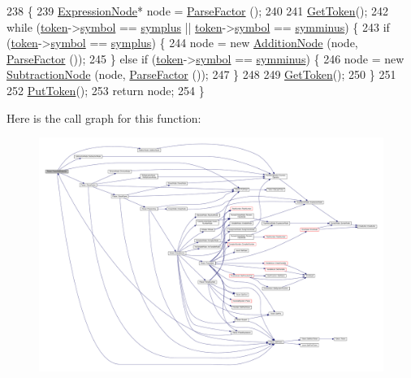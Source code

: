 \begin{DoxyCode}
238 \{
239     \hyperlink{classExpressionNode}{ExpressionNode}* node = \hyperlink{classParser_a70c674c7b40f7a0ab1df0523c4c8c530}{ParseFactor} ();
240 
241     \hyperlink{classParser_a415a103e66558b4d366d9a1420561fe3}{GetToken}();
242     \textcolor{keywordflow}{while} (\hyperlink{classParser_a467028559d31c5b33f16ca8be56715cc}{token}->\hyperlink{structToken_aa671eaaae5632c5277e89a090d864820}{symbol} == \hyperlink{lex_8h_a7feef761cd73fac6e25b8bb80d2c4e54a8b82e1abf6424d09e2381b95f3bd5e00}{symplus} || \hyperlink{classParser_a467028559d31c5b33f16ca8be56715cc}{token}->\hyperlink{structToken_aa671eaaae5632c5277e89a090d864820}{symbol} == 
      \hyperlink{lex_8h_a7feef761cd73fac6e25b8bb80d2c4e54ac9d48bb4c6d7713a366e601a9b95c2c4}{symminus}) \{
243         \textcolor{keywordflow}{if} (\hyperlink{classParser_a467028559d31c5b33f16ca8be56715cc}{token}->\hyperlink{structToken_aa671eaaae5632c5277e89a090d864820}{symbol} == \hyperlink{lex_8h_a7feef761cd73fac6e25b8bb80d2c4e54a8b82e1abf6424d09e2381b95f3bd5e00}{symplus}) \{
244             node = \textcolor{keyword}{new} \hyperlink{classAdditionNode}{AdditionNode} (node, \hyperlink{classParser_a70c674c7b40f7a0ab1df0523c4c8c530}{ParseFactor} ());
245         \} \textcolor{keywordflow}{else} \textcolor{keywordflow}{if} (\hyperlink{classParser_a467028559d31c5b33f16ca8be56715cc}{token}->\hyperlink{structToken_aa671eaaae5632c5277e89a090d864820}{symbol} == \hyperlink{lex_8h_a7feef761cd73fac6e25b8bb80d2c4e54ac9d48bb4c6d7713a366e601a9b95c2c4}{symminus}) \{
246             node = \textcolor{keyword}{new} \hyperlink{classSubtractionNode}{SubtractionNode} (node, \hyperlink{classParser_a70c674c7b40f7a0ab1df0523c4c8c530}{ParseFactor} ());
247         \}
248 
249         \hyperlink{classParser_a415a103e66558b4d366d9a1420561fe3}{GetToken}();
250     \}
251 
252     \hyperlink{classParser_adb5c3a188b36f7ecb198ae30f06338b3}{PutToken}();
253     \textcolor{keywordflow}{return} node;
254 \}
\end{DoxyCode}


Here is the call graph for this function\+:
\nopagebreak
\begin{figure}[H]
\begin{center}
\leavevmode
\includegraphics[width=350pt]{d0/d40/classParser_a47ba11ddd167c1b0b5cf1d2fd1cf1ccd_cgraph}
\end{center}
\end{figure}




